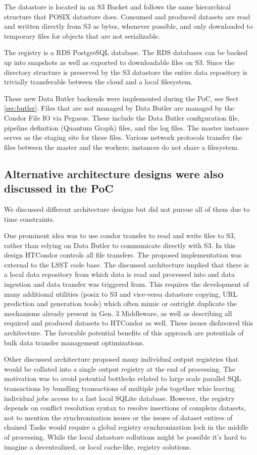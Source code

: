 The datastore is located in an S3 Bucket and follows the same hierarchical structure that POSIX datastore does. Consumed and produced datasets are read and written directly from S3 as bytes, whenever possible, and only downloaded to temporary files for objects that are not serializable.

The registry is a RDS PostgreSQL database. The RDS databases can be backed up into snapshots as well as exported to downloadable files on S3. Since the directory structure is preserved by the S3 datastore the entire data repository is trivially transferable between the cloud and a local filesystem.

These new Data Butler backends were implemented during the PoC, see Sect \ref{sec:butler}. Files that are not managed by Data Butler are managed by the Condor File IO via Pegasus. These include the Data Butler configuration file, pipeline definition (Quantum Graph) files, and the log files. The master instance serves as the staging site for these files. Various network protocols transfer the files between the master and the workers; instances do not share a filesystem.

\subsection{Alternative architecture designs were also discussed in the PoC}

We discussed different architecture designs but did not pursue all of them due to time constraints.

One prominent idea was to use condor transfer to read and write files to S3, rather than relying on Data Butler to communicate directly with S3. In this design HTCondor controls all file transfers. The proposed implementation was external to the LSST code base. The discussed architecture implied that there is a local data repository from which data is read and processed into and data ingestion and data transfer was triggered from. This requires the development of many additional utilities (posix to S3 and vice-versa datastore copying, URL prediction and generation tools) which often mimic or outright duplicate the mechanisms already present in Gen. 3 Middleware, as well as describing all required and produced datasets to HTCondor as well. These issues disfavored this architecture. The favorable potential benefits of this approach are potentials of bulk data transfer management optimizations.

Other discussed architecture proposed many individual output registries that would be collated into a single output registry at the end of processing. The motivation was to avoid potential bottlecks related to large scale parallel SQL transactions by bundling transactions of multiple jobs together whie leaving individual jobs access to a fast local SQLite database. However, the registry depends on conflict resolution syntax to resolve insertions of complexs datasets, not to mention the synchronization issues or the issues of dataset entires of chained Tasks would require a global registry synchronization lock in the middle of processing. While the local datastore sollutions might be possible it's hard to imagine a decentralized, or local cache-like, registry solutions. 


